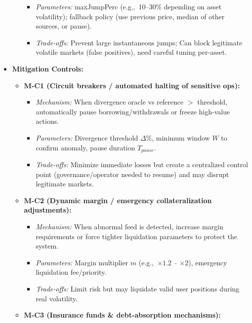 \begin{itemize}
\begin{itemize}
\begin{itemize}
                    \item \textit{Parameters:} maxJumpPerc (e.g.,\ 10--30\% depending on asset volatility); fallback policy (use previous price, median of other sources, or pause).
                    \item \textit{Trade-offs:} Prevent large instantaneous jumps; Can block legitimate volatile markets (false positives), need careful tuning per-asset.
                \end{itemize}
        \end{itemize}

    \item \textbf{Mitigation Controls:}
        \begin{itemize}
            \item \textbf{M-C1 (Circuit breakers / automated halting of sensitive ops):}
                \begin{itemize}
                    \item \textit{Mechanism:} When divergence oracle vs reference $>$ threshold, automatically pause borrowing/withdrawals or freeze high-value actions.
                    \item \textit{Parameters:} Divergence threshold $\Delta\%$, minimum window $W$ to confirm anomaly, pause duration $T_{pause}$.
                    \item \textit{Trade-offs:} Minimize immediate losses but create a centralized control point (governance/operator needed to resume) and may disrupt legitimate markets.
                \end{itemize}
            \item \textbf{M-C2 (Dynamic margin / emergency collateralization adjustments):}
                \begin{itemize}
                    \item \textit{Mechanism:} When abnormal feed is detected, increase margin requirements or force tighter liquidation parameters to protect the system.
                    \item \textit{Parameters:} Margin multiplier $m$ (e.g.,\ $\times 1.2$ -- $\times 2$), emergency liquidation fee/priority.
                    \item \textit{Trade-offs:} Limit risk but may liquidate valid user positions during real volatility.
                \end{itemize}
            \item \textbf{M-C3 (Insurance funds \& debt-absorption mechanisms):}
                \begin{itemize}

\end{itemize}
\end{itemize}
\end{itemize}
